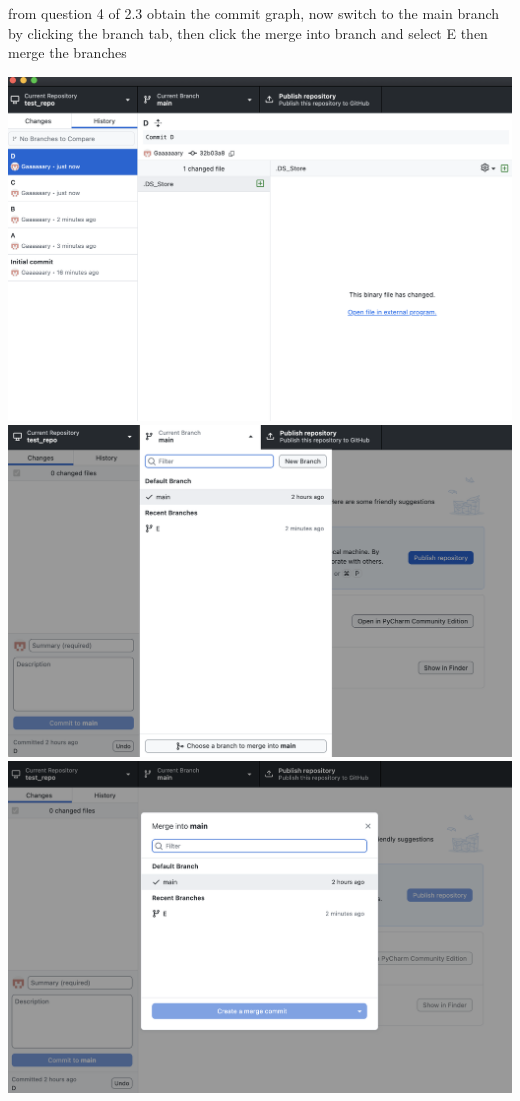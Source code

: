 \documentclass[10pt,twocolumn]{article}
\begin{document}
\begin{enumerate}
\medskip
from question 4 of 2.3 obtain the commit graph, now switch to the main branch by clicking the branch tab, then click the merge into branch and select E then merge the branches
\medskip

\includegraphics[width=\linewidth]{10.png}
\includegraphics[width=\linewidth]{11.png}
\includegraphics[width=\linewidth]{12.png}




\end{enumerate}
\end{document}
